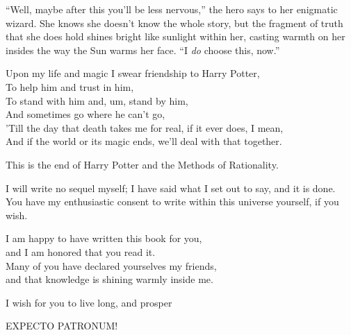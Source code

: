 “Well, maybe after this you’ll be less nervous,” the hero says to her enigmatic wizard. She knows she doesn’t know the whole story, but the fragment of truth that she does hold shines bright like sunlight within her, casting warmth on her insides the way the Sun warms her face. “I \emph{do} choose this, now.”

\begin{em}
\noindent{}Upon my life and magic I swear friendship to Harry Potter,\\
To help him and trust in him,\\
To stand with him and, um, stand by him,\\
And sometimes go where he can’t go,\\
’Till the day that death takes me for real, if it ever does, I mean,\\
And if the world or its magic ends, we’ll deal with that together.
\end{em}

\newpage
\begin{chapterOpeningAuthorNote}
This is the end of Harry Potter and the Methods of Rationality.

I will write no sequel myself; I have said what I set out to say, and it is done.\\
You have my enthusiastic consent to write within this universe yourself, if you wish.




I am happy to have written this book for you,\\
and I am honored that you read it.\\
Many of you have declared yourselves my friends,\\
and that knowledge is shining warmly inside me.

I wish for you to live long, and prosper
\end{chapterOpeningAuthorNote}
\begin{chapterOpeningQuote}
EXPECTO PATRONUM!
\end{chapterOpeningQuote}

